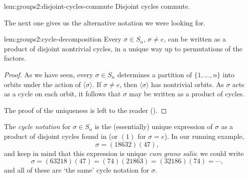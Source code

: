 \begin{lem}{}{lem:groups2:disjoint-cycles-commute}
  Disjoint cycles commute.
\end{lem}

The next one gives us the alternative notation we were looking for.

\begin{lem}{}{lem:groups2:cycle-decomposition}
  Every $\sigma \in S_n$, $\sigma \neq e$, can be written as a product
  of disjoint nontrivial cycles, in a unique way up to permutations of
  the factors.
\end{lem}

\begin{proof}
  As we have seen, every $\sigma \in S_n$ determines a partition of
  $\{1,\dots,n\}$ into orbits under the action of
  $\langle\sigma\rangle$. If $\sigma \neq e$, then
  $\langle\sigma\rangle$ has nontrivial orbits. As $\sigma$ acts as a
  cycle on each orbit, it follows that $\sigma$ may be written as a
  product of cycles.

  The proof of the uniqueness is left to the reader
  ().
\end{proof}
The \emph{cycle notation} for $\sigma \in S_n$ is the (essentially)
unique expression of $\sigma$ as a product of disjoint cycles found in
 (or $(1)$ for $\sigma = e$). In
our running example,
\[
  \sigma = (18632)(47),
\]
and keep in mind that this expression is unique \emph{cum grano
  salis}: we could write
\[
  \sigma = (63218)(47) = (74)(21863) = (32186)(74) = \cdots,
\]
and all of these are `the same' cycle notation for $\sigma$.

